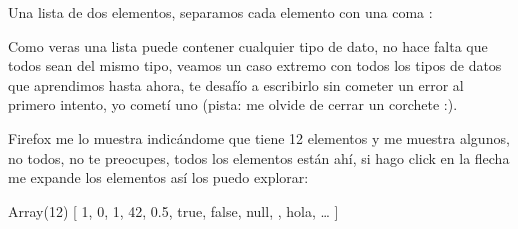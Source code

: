 \documentclass[letterpaper,10pt,spanish]{sphinxmanual}
\begin{document}
%
\begin{sphinxVerbatim}[commandchars=\\\{\}]
  \PYG{p}{[}  \PYG{p}{]}
\end{sphinxVerbatim}

Una lista de dos elementos, separamos cada elemento con una coma \sphinxtitleref{,}:

%
\begin{sphinxVerbatim}[commandchars=\\\{\}]
\PYG{p}{[} \PYG{p}{]}
\end{sphinxVerbatim}

%
\begin{sphinxVerbatim}[commandchars=\\\{\}]
  \PYG{p}{[}   \PYG{p}{]}
\end{sphinxVerbatim}

Como veras una lista puede contener cualquier tipo de dato, no hace falta que
todos sean del mismo tipo, veamos un caso extremo con todos los tipos de datos
que aprendimos hasta ahora, te desafío a escribirlo sin cometer un error al
primero intento, yo cometí uno (pista: me olvide de cerrar un corchete :).

%
\begin{sphinxVerbatim}[commandchars=\\\{\}]
\PYG{p}{[}          \PYG{p}{[}\PYG{p}{]} \PYG{p}{[}\PYG{p}{[}\PYG{p}{]}\PYG{p}{]}\PYG{p}{]}
\end{sphinxVerbatim}

Firefox me lo muestra indicándome que tiene 12 elementos y me muestra algunos,
no todos, no te preocupes, todos los elementos están ahí, si hago click en la
flecha \sphinxtitleref{\textgreater{}} me expande los elementos así los puedo explorar:

%
\begin{sphinxVerbatim}[commandchars=\\\{\}]
\PYGZlt{} Array(12) [ \PYGZhy{}1, 0, 1, 42, 0.5, true, false, null, \PYGZdq{}\PYGZdq{}, \PYGZdq{}hola\PYGZdq{}, … ]
\end{sphinxVerbatim}
\end{document}

